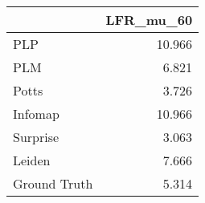 \begin{tabular}{lr}
\toprule
{} & LFR_mu_60 \\
\midrule
PLP          &    10.966 \\
PLM          &     6.821 \\
Potts        &     3.726 \\
Infomap      &    10.966 \\
Surprise     &     3.063 \\
Leiden       &     7.666 \\
Ground Truth &     5.314 \\
\bottomrule
\end{tabular}
